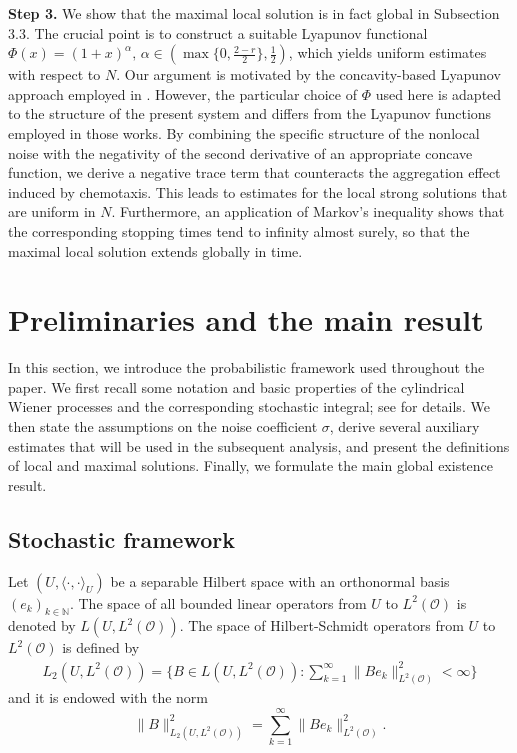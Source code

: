 \documentclass[reqno, 11pt]{amsart}
\theoremstyle{definition}
\numberwithin{equation}{section} \numberwithin{lem}{section}
\numberwithin{thm}{section} \numberwithin{prop}{section}
\numberwithin{cor}{section} \numberwithin{rem}{section}
\numberwithin{defn}{section}
\begin{document}
  \textbf{Step 3.}
   We show that the maximal local solution is in fact global in Subsection 3.3. The crucial point is to construct a suitable Lyapunov functional $\Phi(x)=(1+x)^\alpha,\,\alpha\in (\max \{0,\frac{2-r}{2}\},\frac12)$, which yields uniform estimates with respect to $N$. Our argument is motivated by the concavity-based Lyapunov approach employed in \cite{brzezniak2005stochastic,chen2025well,tang2024strong,tang2023noise}. However, the particular choice of \(\Phi\) used here is adapted to the structure of the present system and differs from the Lyapunov functions employed in those works.  By combining the specific structure of the nonlocal noise with the negativity of the second derivative of an appropriate concave function, we derive a negative trace term that counteracts the aggregation effect induced by chemotaxis. This leads to estimates for the local strong solutions that are uniform in $N$.
    Furthermore, an application of Markov's inequality shows that the corresponding stopping times tend to infinity almost surely, so that the maximal local solution extends globally in time.

 
  











 

 






 \section{Preliminaries and the main result}
 In this section, we introduce the probabilistic framework used throughout the paper. We first recall some notation and  basic properties of the cylindrical Wiener processes and the corresponding stochastic integral;  see \cite[Chapter 2]{liu2015stochastic} for details.  We then state the assumptions on the noise coefficient $\sigma$, derive several auxiliary estimates that will be used in the subsequent analysis, and present the definitions of local and maximal solutions. Finally, we formulate the main global existence result. 

 \subsection{Stochastic framework}  
   Let $(U,\langle\cdot,\cdot\rangle_U)$   be a separable Hilbert space with an orthonormal basis $(e_k)_{k\in\mathbb{N}}$.  The space of all bounded linear operators from $U$ to $L^2(\mathcal {O})$ is denoted by $L(U,L^2(\mathcal {O}))$. The space of Hilbert-Schmidt operators from $U$ to $L^2(\mathcal {O})$ is defined by 
 \begin{align*}
     L_2(U,L^2(\mathcal {O}))=\Big\{B\in L(U,L^2(\mathcal {O})):\sum _{k=1}^{\infty}\|Be_k\|_{L^2(\mathcal {O})}^2<\infty\Big\}
 \end{align*}
 and it is endowed with the norm $$\|B\|_{L_2(U,{L^2(\mathcal {O})})}^2=\sum _{k=1}^{\infty}\|Be_k\|_{L^2(\mathcal {O})}^2.$$ 
 
\end{document}
